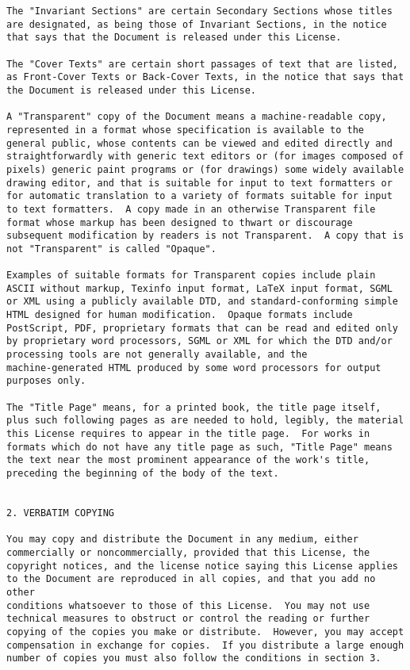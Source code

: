 \documentclass{report}
\begin{document}
\begin{verbatim}
The "Invariant Sections" are certain Secondary Sections whose titles
are designated, as being those of Invariant Sections, in the notice
that says that the Document is released under this License.

The "Cover Texts" are certain short passages of text that are listed,
as Front-Cover Texts or Back-Cover Texts, in the notice that says that
the Document is released under this License.

A "Transparent" copy of the Document means a machine-readable copy,
represented in a format whose specification is available to the
general public, whose contents can be viewed and edited directly and
straightforwardly with generic text editors or (for images composed of
pixels) generic paint programs or (for drawings) some widely available
drawing editor, and that is suitable for input to text formatters or
for automatic translation to a variety of formats suitable for input
to text formatters.  A copy made in an otherwise Transparent file
format whose markup has been designed to thwart or discourage
subsequent modification by readers is not Transparent.  A copy that is
not "Transparent" is called "Opaque".

Examples of suitable formats for Transparent copies include plain
ASCII without markup, Texinfo input format, LaTeX input format, SGML
or XML using a publicly available DTD, and standard-conforming simple
HTML designed for human modification.  Opaque formats include
PostScript, PDF, proprietary formats that can be read and edited only
by proprietary word processors, SGML or XML for which the DTD and/or
processing tools are not generally available, and the
machine-generated HTML produced by some word processors for output
purposes only.

The "Title Page" means, for a printed book, the title page itself,
plus such following pages as are needed to hold, legibly, the material
this License requires to appear in the title page.  For works in
formats which do not have any title page as such, "Title Page" means
the text near the most prominent appearance of the work's title,
preceding the beginning of the body of the text.


2. VERBATIM COPYING

You may copy and distribute the Document in any medium, either
commercially or noncommercially, provided that this License, the
copyright notices, and the license notice saying this License applies
to the Document are reproduced in all copies, and that you add no other
conditions whatsoever to those of this License.  You may not use
technical measures to obstruct or control the reading or further
copying of the copies you make or distribute.  However, you may accept
compensation in exchange for copies.  If you distribute a large enough
number of copies you must also follow the conditions in section 3.


\end{verbatim}
\end{document}
